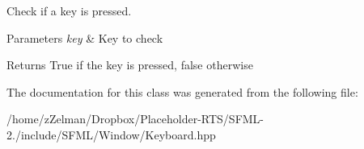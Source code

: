 Check if a key is pressed. 


\begin{DoxyParams}{Parameters}
{\em key} & Key to check\\
\hline
\end{DoxyParams}
\begin{DoxyReturn}{Returns}
True if the key is pressed, false otherwise 
\end{DoxyReturn}


The documentation for this class was generated from the following file\-:\begin{DoxyCompactItemize}
\item 
/home/z\-Zelman/\-Dropbox/\-Placeholder-\/\-R\-T\-S/\-S\-F\-M\-L-\/2./include/\-S\-F\-M\-L/\-Window/Keyboard.\-hpp\end{DoxyCompactItemize}
